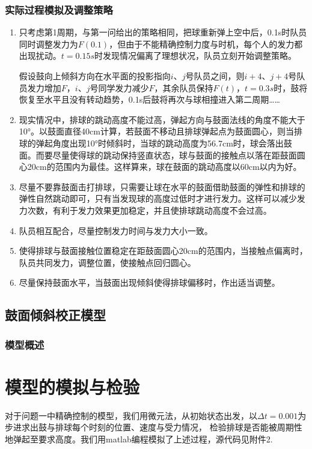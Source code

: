 \documentclass[withoutpreface,bwprint]{cumcmthesis} %
\begin{document}
\subsubsection{实际过程模拟及调整策略}
\begin{enumerate}
\item 只考虑第1周期，与第一问给出的策略相同，把球重新弹上空中后，0.1s时队员同时调整发力为$F(0.1)$，但由于不能精确控制力度与时机，每个人的发力都出现扰动。$t=0.15s$时发现情况偏离了理想状况，队员立刻开始调整策略。

假设鼓向上倾斜方向在水平面的投影指向$i$、$j$号队员之间，则$i+4$、$j+4$号队员发力增加$F$，$i$、$j$号同学发力减少$F$，其余队员保持$F(t)$，$t=0.3s$时，鼓将恢复至水平且没有转动趋势，0.1s后鼓将再次与球相撞进入第二周期……
\item 现实情况中，排球的跳动高度不能过高，弹起方向与鼓面法线的角度不能大于10°。以鼓面直径40cm计算，若鼓面不移动且排球弹起点为鼓面圆心，则当排球的弹起角度出现10°时倾斜时，当球的跳动高度为56.7cm时，球会落出鼓面。而要尽量使得球的跳动保持竖直状态，球与鼓面的接触点以落在距鼓面圆心20cm的范围内为最佳。这样算来，球在鼓面的跳动高度以60cm以内为好。
\item 尽量不要靠鼓面击打排球，只需要让球在水平的鼓面借助鼓面的弹性和排球的弹性自然跳动即可，只有当发现球的高度过低时才进行发力。这样可以减少发力次数，有利于发力效果更加稳定，并且使排球跳动高度不会过高。
\item 队员相互配合，尽量控制发力时间与发力大小一致。
\item 使得排球与鼓面接触位置稳定在距鼓面圆心20cm的范围内，当接触点偏离时，队员共同发力，调整位置，使接触点回归圆心。
\item 尽量保持鼓面水平，当鼓面出现倾斜使得排球偏移时，作出适当调整。
\end{enumerate}

\subsection{鼓面倾斜校正模型}
\subsubsection{模型概述}


\section{模型的模拟与检验}

对于问题一中精确控制的模型，我们用微元法，从初始状态出发，以$\Delta t=0.001$为步进求出鼓与排球每个时刻的位置、速度与受力情况，
检验排球是否能被周期性地弹起至要求高度。我们用matlab编程模拟了上述过程，源代码见附件2.
\end{document}
